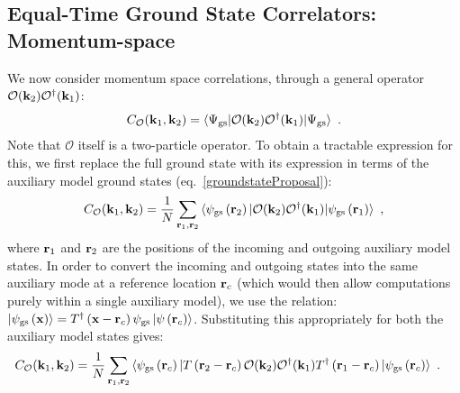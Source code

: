 \documentclass[reprint,hidelinks,onecolumn]{revtex4-2}
\begin{document}
\subsection{Equal-Time Ground State Correlators: Momentum-space}
We now consider momentum space correlations, through a general operator \(\mathcal{O}({\bf k}_2)\mathcal{O}^\dagger({\bf k}_1)\):
\begin{equation}\begin{aligned}
	C_{\mathcal{O}}({\bf k}_1,{\bf k}_2) = \braket{\Psi_\text{gs} | \mathcal{O}({\bf k}_2)\mathcal{O}^\dagger({\bf k}_1) | \Psi_\text{gs}}~.
\end{aligned}\end{equation}
Note that \(\mathcal{O}\) itself is a two-particle operator. To obtain a tractable expression for this, we first replace the full ground state with its expression in terms of the auxiliary model ground states (eq.~\ref{groundstateProposal}):
\begin{equation}\begin{aligned}
	C_{\mathcal{O}}({\bf k}_1,{\bf k}_2) = \frac{1}{N}\sum_{{\bf r}_1,{\bf r}_2}\braket{\psi_\text{gs}\left({\bf r}_2\right)  | \mathcal{O}({\bf k}_2)\mathcal{O}^\dagger({\bf k}_1) | \psi_\text{gs}\left({\bf r}_1\right)}~,
\end{aligned}\end{equation}
where \({\bf r}_1\) and \({\bf r}_2 \) are the positions of the incoming and outgoing auxiliary model states. In order to convert the incoming and outgoing states into the same auxiliary mode at a reference location \({\bf r}_c\) (which would then allow computations purely within a single auxiliary model), we use the relation: \(\ket{\psi_\text{gs}\left({\bf x}\right)} = T^\dagger\left({\bf x} - {\bf r}_c\right)\psi_\text{gs}\ket{\psi\left({\bf r}_c \right)}\). Substituting this appropriately for both the auxiliary model states gives:
\begin{equation}\begin{aligned}
	C_{\mathcal{O}}({\bf k}_1,{\bf k}_2) &= \frac{1}{N}\sum_{{\bf r}_1,{\bf r}_2}\braket{\psi_\text{gs}\left({\bf r}_c\right) | T\left({\bf r}_2 - {\bf r}_c\right) \mathcal{O}({\bf k}_2)\mathcal{O}^\dagger({\bf k}_1) T^\dagger\left({\bf r}_1 - {\bf r}_c\right) | \psi_\text{gs}\left({\bf r}_c\right)}~.
\end{aligned}\end{equation}
\end{document}
